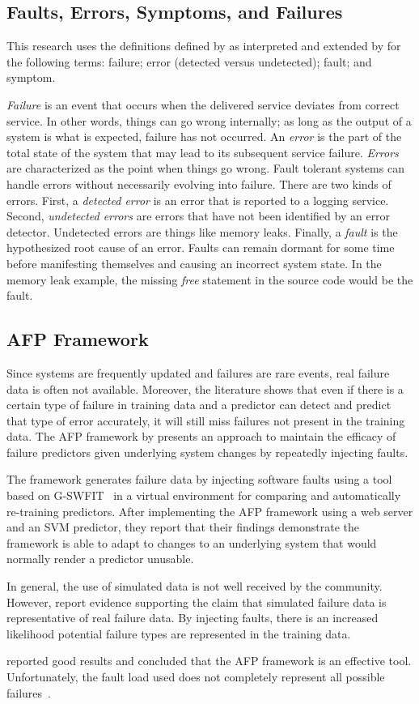 \subsection{Faults, Errors, Symptoms, and Failures}
This research uses the definitions defined by \citet{avivzienis2004basic} as
interpreted and extended by \citet{salfnerSurvey} for the following terms:
failure; error (detected versus undetected); fault; and symptom.

\emph{Failure} is an event that occurs when the delivered service deviates from
correct service.  In other words, things can go wrong internally; as long as
the output of a system is what is expected, failure has not occurred.  An
\emph{error} is the part of the total state of the system that may lead to its
subsequent service failure.  \emph{Errors} are characterized as the point when
things go wrong.  Fault tolerant systems can handle errors without necessarily
evolving into failure.  There are two kinds of errors.  First, a \emph{detected
error} is an error that is reported to a logging service.  Second,
\emph{undetected errors} are errors that have not been identified by an error
detector.  Undetected errors are things like memory leaks.  Finally, a
\emph{fault} is the hypothesized root cause of an error.  Faults can remain
dormant for some time before manifesting themselves and causing an incorrect
system state.  In the memory leak example, the missing \emph{free} statement in
the source code would be the fault.  

\subsection{\acrfull{AFP} Framework} \label{afp}
Since systems are frequently updated and failures are rare events, real failure
data is often not available.  Moreover, the literature shows that even if there
is a certain type of failure in training data and a predictor can detect and
predict that type of error accurately, it will still miss failures not present
in the training data.  The \ac{AFP} framework by \citet{irrera2015} presents an
approach to maintain the efficacy of failure predictors given underlying system
changes by repeatedly injecting faults.

The framework generates failure data by injecting software faults using a tool
based on \ac{G-SWFIT}~\citep{gswfit} in a virtual environment for comparing and
automatically re-training predictors.  After implementing the \ac{AFP}
framework using a web server and an \ac{SVM} predictor, they report that their
findings demonstrate the framework is able to adapt to changes to an underlying
system that would normally render a predictor unusable.

In general, the use of simulated data is not well received by the community.
However, \citet{irrera2010,irrera2014} report evidence supporting the claim
that simulated failure data is representative of real failure data.  By
injecting faults, there is an increased likelihood potential failure types are
represented in the training data.

\citet{irrera2015} reported good results and concluded that the \ac{AFP}
framework is an effective tool.  Unfortunately, the fault load used does not
completely represent all possible failures~\citep{kikuchi2014}.
